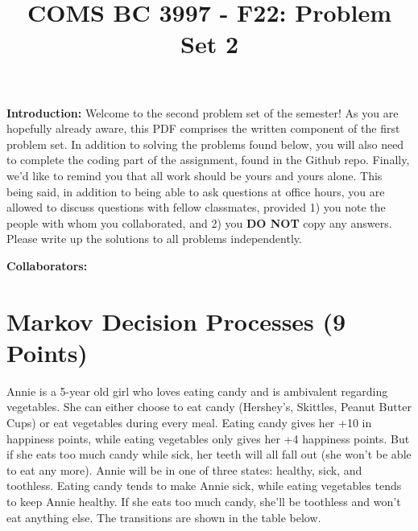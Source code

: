 \documentclass[]{article}
\title{COMS BC 3997 - F22: Problem Set 2}
\author{
}
\date{}
\begin{document}
\maketitle %

\textbf{Introduction:}  
Welcome to the second problem set of the semester!  As you are hopefully already aware, this PDF comprises the written component of the first problem set.  In addition to solving the problems found below, you will also need to complete the coding part of the assignment, found in the Github repo. Finally, we'd like to remind you that all work should be yours and yours alone. This being said, in addition to being able to ask questions at office hours, you are allowed to discuss questions with fellow classmates, provided 1) you note the people with whom you collaborated, and 2) you \textbf{DO NOT} copy any answers. Please write up the solutions to all problems independently.

\bigskip
\textbf{Collaborators:}
\clearpage

\section{Markov Decision Processes (9 Points)}
Annie is a 5-year old girl who loves eating candy and is ambivalent regarding vegetables. She can either choose to eat candy (Hershey's, Skittles, Peanut Butter Cups) or eat vegetables during every meal. Eating candy gives her +10 in happiness points, while eating vegetables only gives her +4 happiness points. But if she eats too much candy while sick, her teeth will all fall out (she won't be able to eat any more). Annie will be in one of three states: healthy, sick, and toothless. Eating candy tends to make Annie sick, while eating vegetables tends to keep Annie healthy. If she eats too much candy, she'll be toothless and won't eat anything else. The transitions are shown in the table below.
\end{document}

